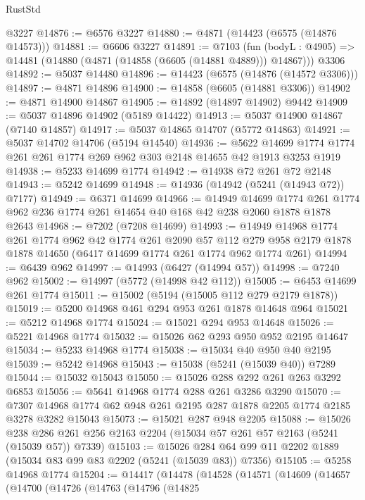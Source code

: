 \begin{lexlean}{RustStd}
\begin{coremodule}
{\begin{coremodule}
{{{{{{{{{{{{{{{{{{{{{{{{{{{{{    @3227
@14876 := @6576 @3227
@14880 := @4871 (@14423 (@6575 (@14876 @14573)))
@14881 := @6606 @3227
@14891 := @7103
    (fun (bodyL : @4905) => @14481 (@14880 (@4871 (@14858 (@6605 (@14881 @4889))) @14867)))
    @3306
@14892 := @5037 @14480
@14896 := @14423 (@6575 (@14876 (@14572 @3306)))
@14897 := @4871 @14896
@14900 := @14858 (@6605 (@14881 @3306))
@14902 := @4871 @14900 @14867
@14905 := @14892 (@14897 @14902) @9442
@14909 := @5037 @14896 @14902 (@5189 @14422)
@14913 := @5037 @14900 @14867 (@7140 @14857)
@14917 := @5037 @14865 @14707 (@5772 @14863)
@14921 := @5037 @14702 @14706 (@5194 @14540)
@14936 := @5622 @14699 @1774 @1774 @261 @261 @1774 @269 @962 @303 @2148 @14655 @42 @1913 @3253 @1919
@14938 := @5233 @14699 @1774
@14942 := @14938 @72 @261 @72 @2148
@14943 := @5242 @14699
@14948 := @14936 (@14942 (@5241 (@14943 @72)) @7177)
@14949 := @6371 @14699
@14966 := @14949
    @14699
    @1774
    @261
    @1774
    @962
    @236
    @1774
    @261
    @14654
    @40
    @168
    @42
    @238
    @2060
    @1878
    @1878
    @2643
@14968 := @7202 (@7208 @14699)
@14993 := @14949
    @14968
    @1774
    @261
    @1774
    @962
    @42
    @1774
    @261
    @2090
    @57
    @112
    @279
    @958
    @2179
    @1878
    @1878
    @14650
    (@6417 @14699 @1774 @261 @1774 @962 @1774 @261)
@14994 := @6439 @962
@14997 := @14993 (@6427 (@14994 @57))
@14998 := @7240 @962
@15002 := @14997 (@5772 (@14998 @42 @112))
@15005 := @6453 @14699 @261 @1774
@15011 := @15002 (@5194 (@15005 @112 @279 @2179 @1878))
@15019 := @5200 @14968 @461 @294 @953 @261 @1878 @14648 @964
@15021 := @5212 @14968 @1774
@15024 := @15021 @294 @953 @14648
@15026 := @5221 @14968 @1774
@15032 := @15026 @62 @293 @950 @952 @2195 @14647
@15034 := @5233 @14968 @1774
@15038 := @15034 @40 @950 @40 @2195
@15039 := @5242 @14968
@15043 := @15038 (@5241 (@15039 @40)) @7289
@15044 := @15032 @15043
@15050 := @15026 @288 @292 @261 @263 @3292 @6853
@15056 := @5641 @14968 @1774 @288 @261 @3286 @3290
@15070 := @7307 @14968 @1774 @62 @948 @261 @2195 @287 @1878 @2205 @1774 @2185 @3278 @3282 @15043
@15073 := @15021 @287 @948 @2205
@15088 := @15026
    @238
    @286
    @261
    @256
    @2163
    @2204
    (@15034 @57 @261 @57 @2163 (@5241 (@15039 @57)) @7339)
@15103 := @15026 @284 @64 @99 @11 @2202 @1889 (@15034 @83 @99 @83 @2202 (@5241 (@15039 @83)) @7356)
@15105 := @5258 @14968 @1774
@15204 := @14417
    (@14478
      (@14528
        (@14571
          (@14609
            (@14657
              (@14700
                (@14726
                  (@14763
                    (@14796
                      (@14825
}}}}}}}}}}}}}}}}}}}}}}}}}}}}}
\end{coremodule}}
\end{coremodule}
\end{lexlean}

